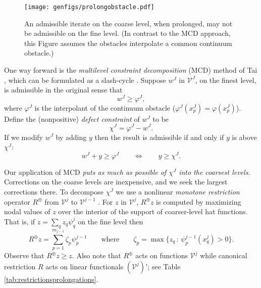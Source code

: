 \documentclass[letterpaper,final,12pt,reqno]{amsart}
\theoremstyle{claim}
\newcommand{\mR}{R^{\bm{\oplus}}}
\numberwithin{equation}{section}
\numberwithin{figure}{section}
\numberwithin{table}{section}
\numberwithin{theorem}{section}
\begin{document}
\begin{figure}
\qquad \texttt{[image: genfigs/prolongobstacle.pdf]}
\caption{An admissible iterate on the coarse level, when prolonged, may not be admissible on the fine level.  (In contrast to the MCD approach, this Figure assumes the obstacles interpolate a common continuum obstacle.)}
\label{fig:prolongobstacle}
\end{figure}

One way forward is the \emph{multilevel constraint decomposition} (MCD) method of Tai \cite{Tai2003}, which can be formulated as a slash-cycle \cite[Algorithm 4.7]{GraeserKornhuber2009}.  Suppose $w^J$ in $\mathcal{V}^J$, on the finest level, is admissible in the original sense that
\begin{equation}
  w^J \ge \varphi^J, \label{eq:fineadmissibleiterate}
\end{equation}
where $\varphi^J$ is the interpolant of the continuum obstacle ($\varphi^J(x_p^J)=\varphi(x_p^J)$).  Define the (nonpositive) \emph{defect constraint} \cite{GraeserKornhuber2009} of $w^J$ to be
\begin{equation}
  \chi^J = \varphi^J - w^J.  \label{eq:defectconstraint}
\end{equation}
If we modify $w^J$ by adding $y$ then the result is admissible if and only if $y$ is above $\chi^J$:
\begin{equation}
  w^J + y \ge \varphi^J  \qquad \iff \qquad y \ge \chi^J.  \label{eq:defectmeaning}
\end{equation}

Our application of MCD \emph{puts as much as possible of $\chi^J$ into the coarsest levels.}  Corrections on the coarse levels are inexpensive, and we seek the largest corrections there.  To decompose $\chi^J$ we use a nonlinear \emph{monotone restriction} operator $\mR$ from $\mathcal{V}^j$ to $\mathcal{V}^{j-1}$ \cite[equation (4.22)]{GraeserKornhuber2009}.  For $z$ in $\mathcal{V}^j$, $\mR z$ is computed by maximizing nodal values of $z$ over the interior of the support of coarser-level hat functions.  That is, if $z = \sum_q z_q \psi_q^j$ on the fine level then
\begin{equation}
  \mR z = \sum_{p=1}^{m_{j-1}} \zeta_p \psi_p^{j-1} \qquad \text{where} \qquad \zeta_p = \max \{z_q \,:\, \psi_p^{j-1}(x_q^j) > 0\}.  \label{eq:monotonerestriction}
\end{equation}
Observe that $\mR z \ge z$.  Also note that $\mR$ acts on functions $\mathcal{V}^j$ while canonical restriction $R$ acts on linear functionals $(\mathcal{V}^j)'$; see Table \ref{tab:restrictionsprolongations}.
\end{document}
